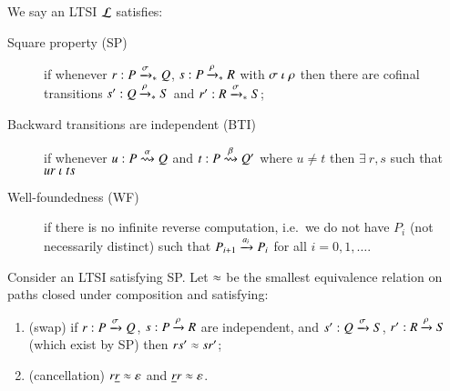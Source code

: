 


\begin{definition}\label{def:basic}
  We say an LTSI $\mathcal{L}$ satisfies:
  \begin{description}
  \item[Square property (SP)] if whenever $r:P \xrightarrow[]{\sigma}_{*} Q$, $s:P
    \xrightarrow[]{\rho}_{*} R$ with $\sigma \mathrel{\iota} \rho$ then there are cofinal
    transitions $s': Q \xrightarrow[]{\rho}_{*} S$ and $r':R \xrightarrow[]{\sigma}_{*}
    S$;%
  \item[Backward transitions are independent (BTI)] if whenever $u:P
    \stackrel{\alpha}{\rightsquigarrow} Q$ and $t: P \stackrel{\beta}{\rightsquigarrow} Q'$ where $u \neq
    t$ then $\exists~r,
    s$ such that $ur \mathrel{\iota} ts$
  \item[Well-foundedness (WF)] if there is no infinite reverse
    computation, i.e.\ we do not have $P_i$ (not necessarily distinct)
    such that $P_{i+1} \xrightarrow[]{a_i} P_i$ for all $i = 0,1,\ldots$.
  \end{description}
\end{definition}

\begin{definition}\label{def:ceqt}
  Consider an LTSI satisfying SP.
  Let $\approx$ be the smallest equivalence relation on paths closed under composition and satisfying:
  \begin{enumerate}
  \item
    (swap)  
    if $r:P \xrightarrow[]{\sigma} Q$, $s:P \xrightarrow[]{\rho} R$ are independent,
    and $s': Q \xrightarrow[]{\sigma} S$, $r':R \xrightarrow[]{\rho} S$ (which exist by SP)
    then $rs' \approx sr'$;
  \item
    (cancellation)
    $r \underline{r} \approx \varepsilon$ \quad and \quad $\underline{r} r \approx \varepsilon$.
  \end{enumerate}
\end{definition}